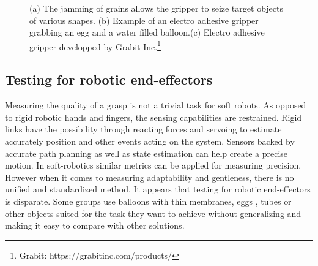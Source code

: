 \begin{figure}[ht]
\centering
{}\quad
{}\quad
{}\quad
\caption[Other Effectors]{\label{f:Other Effectors} (a) The jamming of grains allows the gripper to seize target objects of various shapes. (b) Example of an electro adhesive gripper grabbing an egg and a water filled balloon.(c) Electro adhesive gripper developped by Grabit Inc.\footnote{Grabit: https://grabitinc.com/products/} }
\end{figure}

\subsection{Testing for robotic end-effectors}
\label{s:TestinginRobotics}

 Measuring the quality of a grasp is not a trivial task for soft robots. As opposed to rigid robotic hands and fingers, the sensing capabilities are restrained. Rigid links have the possibility through reacting forces and servoing to estimate accurately position and other events acting on the system. Sensors backed by accurate path planning as well as state estimation can help create a precise motion. In soft-robotics similar metrics can be applied for measuring precision.  However when it comes to measuring adaptability and gentleness, there is no unified and standardized method. It appears that testing for robotic end-effectors is disparate. Some groups use balloons with thin membranes, eggs \cite{shintake2016versatile}, tubes \cite{galloway2016soft} or other objects \cite{odhner2014compliant} suited for the task they want to achieve without generalizing and making it easy to compare with other solutions.
 
